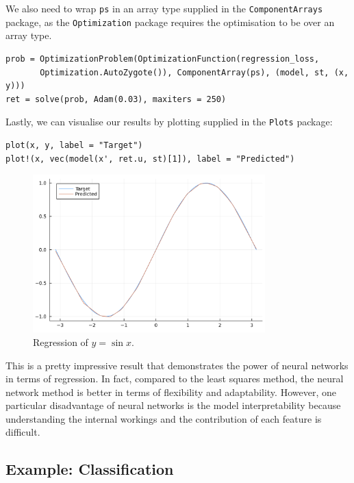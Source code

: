 \documentclass[a4paper,11pt,titlepage]{article}
\theoremstyle{definition}
\theoremstyle{plain}
\theoremstyle{remark}
\begin{document}
We also need to wrap \verb|ps| in an array type supplied in the \verb|ComponentArrays| package, as the \verb|Optimization| package requires the optimisation to be over an array type.

\begin{verbatim}
prob = OptimizationProblem(OptimizationFunction(regression_loss,
       Optimization.AutoZygote()), ComponentArray(ps), (model, st, (x, y)))
ret = solve(prob, Adam(0.03), maxiters = 250)
\end{verbatim}

Lastly, we can visualise our results by plotting supplied in the \verb|Plots| package:

\begin{verbatim}
plot(x, y, label = "Target")
plot!(x, vec(model(x', ret.u, st)[1]), label = "Predicted")
\end{verbatim}

\begin{figure}[htbp]
    \centering
    \includegraphics[width=0.8\textwidth]{figures/Regression.png}
    \caption{Regression of $y = \sin x$.}
\end{figure}

This is a pretty impressive result that demonstrates the power of neural networks in terms of regression. In fact, compared to the least squares method, the neural network method is better in terms of flexibility and adaptability. However, one particular disadvantage of neural networks is the model interpretability because understanding the internal workings and the contribution of each feature is difficult.

\subsection{Example: Classification}
\label{sec:cla}
\end{document}
